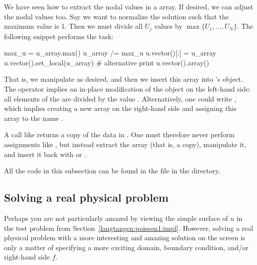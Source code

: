 We have seen how to extract the nodal values in a  array.
If desired, we can adjust the nodal values too. Say we want to normalize
the solution such that the maximum value is 1. Then we must divide all $U_j$
values by $\max\{U_1,\ldots,U_N\}$. The following snippet performs the task:
\begin{python}
max_u = u_array.max()
u_array /= max_u
u.vector()[:] = u_array
u.vector().set_local(u_array)  # alternative
print u.vector().array()
\end{python}
That is, we manipulate  as desired, and then we insert
this array into 's  object.  The \emp{/=} operator
implies an in-place modification of the object on the left-hand side:
all elements of the  are divided by the value .
Alternatively, one could write , which implies creating a new array on the
right-hand side and assigning this array to the name .

A call like  returns a copy of the data in
. One must therefore never perform assignments like
, but instead extract the
 array (that is, a copy), manipulate it, and insert
it back with  or .

All the code in this subsection can be found in the file
 in the  directory.

\subsection{Solving a real physical problem}
\label{langtangen:poisson:membrane}

Perhaps you are not particularly amazed by viewing the simple surface
of $u$ in the test problem from
Section~\ref{langtangen:poisson1:impl}.  However, solving a real
physical problem with a more interesting and amazing solution on the
screen is only a matter of specifying a more exciting domain, boundary
condition, and/or right-hand side $f$.

